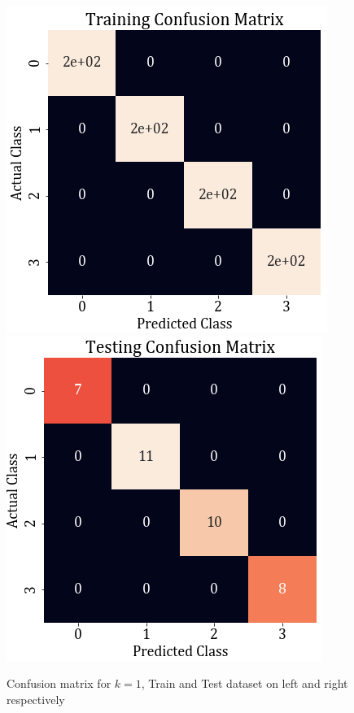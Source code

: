 \documentclass[11pt,a4paper]{article}
\begin{document}
\begin{figure}[H]
    \centering
    \includegraphics[scale=0.55]{images/1A/1A_cm_knn_train.png}
    \hspace{2em}
    \includegraphics[scale=0.55]{images/1A/1A_cm_knn_test.png}
    \caption{Confusion matrix for $k=1$, Train and Test dataset on left and right respectively}
    \label{fig:1A_cm_KNN}
\end{figure}
\end{document}
